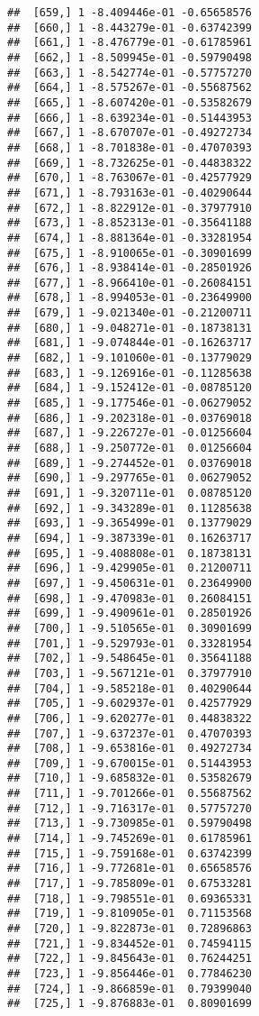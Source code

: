 \documentclass[
  12pt,
]{article}
\begin{document}
\begin{verbatim}
##  [659,] 1 -8.409446e-01 -0.65658576
##  [660,] 1 -8.443279e-01 -0.63742399
##  [661,] 1 -8.476779e-01 -0.61785961
##  [662,] 1 -8.509945e-01 -0.59790498
##  [663,] 1 -8.542774e-01 -0.57757270
##  [664,] 1 -8.575267e-01 -0.55687562
##  [665,] 1 -8.607420e-01 -0.53582679
##  [666,] 1 -8.639234e-01 -0.51443953
##  [667,] 1 -8.670707e-01 -0.49272734
##  [668,] 1 -8.701838e-01 -0.47070393
##  [669,] 1 -8.732625e-01 -0.44838322
##  [670,] 1 -8.763067e-01 -0.42577929
##  [671,] 1 -8.793163e-01 -0.40290644
##  [672,] 1 -8.822912e-01 -0.37977910
##  [673,] 1 -8.852313e-01 -0.35641188
##  [674,] 1 -8.881364e-01 -0.33281954
##  [675,] 1 -8.910065e-01 -0.30901699
##  [676,] 1 -8.938414e-01 -0.28501926
##  [677,] 1 -8.966410e-01 -0.26084151
##  [678,] 1 -8.994053e-01 -0.23649900
##  [679,] 1 -9.021340e-01 -0.21200711
##  [680,] 1 -9.048271e-01 -0.18738131
##  [681,] 1 -9.074844e-01 -0.16263717
##  [682,] 1 -9.101060e-01 -0.13779029
##  [683,] 1 -9.126916e-01 -0.11285638
##  [684,] 1 -9.152412e-01 -0.08785120
##  [685,] 1 -9.177546e-01 -0.06279052
##  [686,] 1 -9.202318e-01 -0.03769018
##  [687,] 1 -9.226727e-01 -0.01256604
##  [688,] 1 -9.250772e-01  0.01256604
##  [689,] 1 -9.274452e-01  0.03769018
##  [690,] 1 -9.297765e-01  0.06279052
##  [691,] 1 -9.320711e-01  0.08785120
##  [692,] 1 -9.343289e-01  0.11285638
##  [693,] 1 -9.365499e-01  0.13779029
##  [694,] 1 -9.387339e-01  0.16263717
##  [695,] 1 -9.408808e-01  0.18738131
##  [696,] 1 -9.429905e-01  0.21200711
##  [697,] 1 -9.450631e-01  0.23649900
##  [698,] 1 -9.470983e-01  0.26084151
##  [699,] 1 -9.490961e-01  0.28501926
##  [700,] 1 -9.510565e-01  0.30901699
##  [701,] 1 -9.529793e-01  0.33281954
##  [702,] 1 -9.548645e-01  0.35641188
##  [703,] 1 -9.567121e-01  0.37977910
##  [704,] 1 -9.585218e-01  0.40290644
##  [705,] 1 -9.602937e-01  0.42577929
##  [706,] 1 -9.620277e-01  0.44838322
##  [707,] 1 -9.637237e-01  0.47070393
##  [708,] 1 -9.653816e-01  0.49272734
##  [709,] 1 -9.670015e-01  0.51443953
##  [710,] 1 -9.685832e-01  0.53582679
##  [711,] 1 -9.701266e-01  0.55687562
##  [712,] 1 -9.716317e-01  0.57757270
##  [713,] 1 -9.730985e-01  0.59790498
##  [714,] 1 -9.745269e-01  0.61785961
##  [715,] 1 -9.759168e-01  0.63742399
##  [716,] 1 -9.772681e-01  0.65658576
##  [717,] 1 -9.785809e-01  0.67533281
##  [718,] 1 -9.798551e-01  0.69365331
##  [719,] 1 -9.810905e-01  0.71153568
##  [720,] 1 -9.822873e-01  0.72896863
##  [721,] 1 -9.834452e-01  0.74594115
##  [722,] 1 -9.845643e-01  0.76244251
##  [723,] 1 -9.856446e-01  0.77846230
##  [724,] 1 -9.866859e-01  0.79399040
##  [725,] 1 -9.876883e-01  0.80901699

\end{verbatim}
\end{document}
